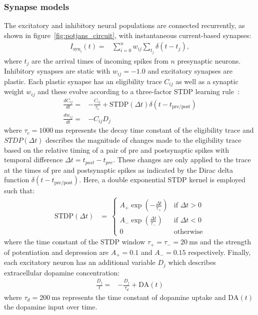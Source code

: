 \documentclass[utf8]{frontiersSCNS} %
\begin{document}
\subsubsection{Synapse models}
The excitatory and inhibitory neural populations are connected recurrently, as shown in figure~\ref{fig:potjans_circuit}, with instantaneous current-based synapses:
%
\begin{align}
    I_{\text{syn}_{i}}(t) = & \sum_{i=0}^{n} w_{ij} \sum_{t_{j}}  \delta(t - t_{j}), \label{eq:delta_synapse}
\end{align}
%
where $t_{j}$ are the arrival times of incoming spikes from $n$ presynaptic neurons.
Inhibitory synapses are static with $w_{ij} = -1.0$ and excitatory synapses are plastic.
Each plastic synapse has an eligibility trace $C_{ij}$ as well as a synaptic weight $w_{ij}$ and these evolve according to a three-factor STDP learning rule~\citep{Izhikevich2007}:
%
\begin{align}
    \frac{dC_{ij}}{dt} = & -\frac{C_{ij}}{\tau_c} + \text{STDP}(\Delta t)\delta(t - t_\text{pre/post}) \label{eq:izhikevich_stdp_c} \\
    \frac{dw_{ij}}{dt} = & -C_{ij}D_j \label{eq:izhikevich_stdp_w}
\end{align}
%
where $\tau_c=\SI{1000}{\milli\second}$ represents the decay time constant of the eligibility trace and $STDP(\Delta t)$ describes the magnitude of changes made to the eligibility trace based on the relative timing of a pair of pre and postsynaptic spikes with temporal difference $\Delta t=t_{post}-t_{pre}$.
These changes are only applied to the trace at the times of pre and postsynaptic spikes as indicated by the Dirac delta function $\delta(t-t_\text{pre/post})$.
Here, a double exponential STDP kernel is employed such that:
%
\begin{align}
    \text{STDP}(\Delta t) & = \
        \begin{cases}
          A_{+}\exp\left(-\frac{\Delta t}{\tau_{+}}\right)  & \text{if } \Delta t>0 \\
          A_{-}\exp\left(\frac{\Delta t}{\tau_{-}}\right)   & \text{if } \Delta t<0 \\
          0                                                 & \text{otherwise}
        \end{cases} \label{eq:stdp_pair}
\end{align}
%
where the time constant of the STDP window $\tau_{+}=\tau_{-}=\SI{20}{\milli\second}$ and the strength of potentiation and depression are $A_{+}=0.1$ and $A_{-}=0.15$ respectively.
Finally, each excitatory neuron has an additional variable $D_j$ which describes extracellular dopamine concentration:
%
\begin{align}
    \frac{D_{j}}{t} = & -\frac{D_{j}}{\tau_d} + \text{DA}(t) \label{eq:izhikevich_stdp_d}
\end{align}
%
where $\tau_d=\SI{200}{\milli\second}$ represents the time constant of dopamine uptake and $\text{DA}(t)$ the dopamine input over time.
\end{document}
